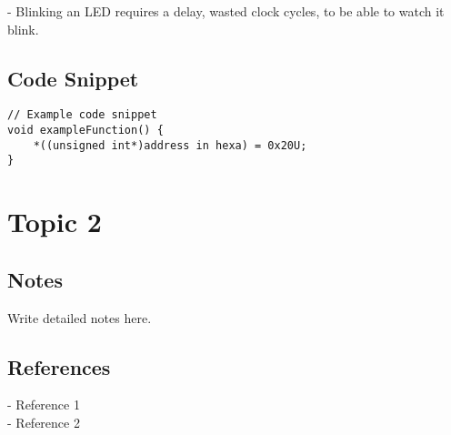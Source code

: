 \documentclass[a4paper,12pt]{article}
\begin{document}
- Blinking an LED requires a delay, wasted clock cycles, to be able to watch it blink.


\subsection{Code Snippet}
\begin{verbatim}
// Example code snippet
void exampleFunction() {
    *((unsigned int*)address in hexa) = 0x20U;
}
\end{verbatim}

\section{Topic 2}
\subsection{Notes}
Write detailed notes here.

\subsection{References}
- Reference 1 \\
- Reference 2
\end{document}
